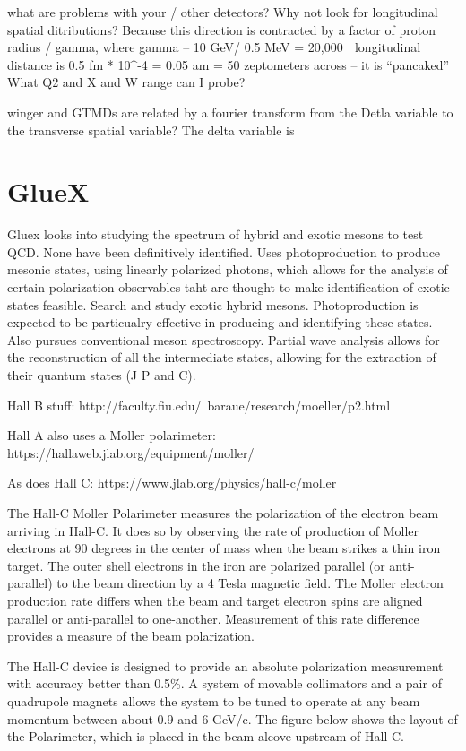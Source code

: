 what are problems with your / other detectors?
Why not look for longitudinal spatial ditributions? Because this direction is contracted by a factor of proton radius / gamma, where gamma – 10 GeV/ 0.5 MeV = 20,000  longitudinal distance is 0.5 fm * 10^-4 = 0.05 am = 50 zeptometers across – it is “pancaked”
What Q2 and X and W range can I probe?

winger and GTMDs are related by a fourier transform from the Detla variable to the transverse spatial variable? The delta variable is

\section{GlueX}
    \indent Gluex looks into studying the spectrum of hybrid and exotic mesons to test QCD. None have been definitively identified. Uses photoproduction to produce mesonic states, using linearly polarized photons, which allows for the analysis of certain polarization observables taht are thought to make identification of exotic states feasible. Search and study exotic hybrid mesons. Photoproduction is expected to be particualry effective in producing and identifying these states. Also pursues conventional meson spectroscopy. Partial wave analysis allows for the reconstruction of all the intermediate states, allowing for the extraction of their quantum states (J P and C). 



Hall B stuff:
http://faculty.fiu.edu/~baraue/research/moeller/p2.html

Hall A also uses a Moller polarimeter:
https://hallaweb.jlab.org/equipment/moller/

As does Hall C:
https://www.jlab.org/physics/hall-c/moller

The Hall-C Moller Polarimeter measures the polarization of the electron beam arriving in Hall-C. It does so by observing the rate of production of Moller electrons at 90 degrees in the center of mass when the beam strikes a thin iron target. The outer shell electrons in the iron are polarized parallel (or anti-parallel) to the beam direction by a 4 Tesla magnetic field. The Moller electron production rate differs when the beam and target electron spins are aligned parallel or anti-parallel to one-another. Measurement of this rate difference provides a measure of the beam polarization.

The Hall-C device is designed to provide an absolute polarization measurement with accuracy better than 0.5\%. A system of movable collimators and a pair of quadrupole magnets allows the system to be tuned to operate at any beam momentum between about 0.9 and 6 GeV/c. The figure below shows the layout of the Polarimeter, which is placed in the beam alcove upstream of Hall-C.




